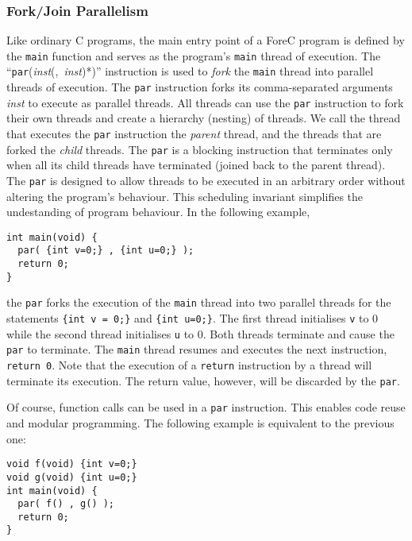 
\subsubsection{Fork/Join Parallelism}
Like ordinary C programs, the main entry point of a ForeC program
is defined by the \verb$main$ function and serves as the program's
\verb$main$ thread of execution. The ``\verb$par$(\emph{inst}(,~\emph{inst})*)''
instruction is used to \emph{fork} the \verb$main$ thread into parallel 
threads of execution. The \verb$par$ instruction forks its comma-separated 
arguments \emph{inst} to execute as parallel threads. All threads can
use the \verb$par$ instruction to fork their own threads and create
a hierarchy (nesting) of threads. We call the 
thread that executes the \verb$par$ instruction the \emph{parent}
thread, and the threads that are forked the \emph{child} threads.
The \verb$par$ is a blocking instruction that terminates only when all
its child threads have terminated (joined back to the parent thread). 
The \verb$par$ is designed to allow threads to be executed in an arbitrary order 
without altering the program's behaviour. This scheduling invariant 
simplifies the undestanding of program behaviour. In the following example,
\begin{lstlisting}[style=snippet]
int main(void) {
  par( {int v=0;} , {int u=0;} );
  return 0;
}
\end{lstlisting}
the \verb$par$ forks the execution of the \verb$main$ thread into 
two parallel threads for the statements \verb${int v = 0;}$ and 
\verb${int u=0;}$. The first thread initialises \verb$v$ to 
$0$ while the second thread initialises \verb$u$ to $0$. Both 
threads terminate and cause the \verb$par$ to terminate. The
\verb$main$ thread resumes and executes the next instruction, \verb$return 0$.
Note that the execution of a \verb$return$ instruction by a thread will 
terminate its execution. The return value, however, will be discarded by 
the \verb$par$. 

Of course, function calls can be used in a \verb$par$ instruction. This
enables code reuse and modular programming. The following example is 
equivalent to the previous one:
\begin{lstlisting}[style=snippet]
void f(void) {int v=0;}
void g(void) {int u=0;}
int main(void) {
  par( f() , g() );
  return 0;
}
\end{lstlisting}


